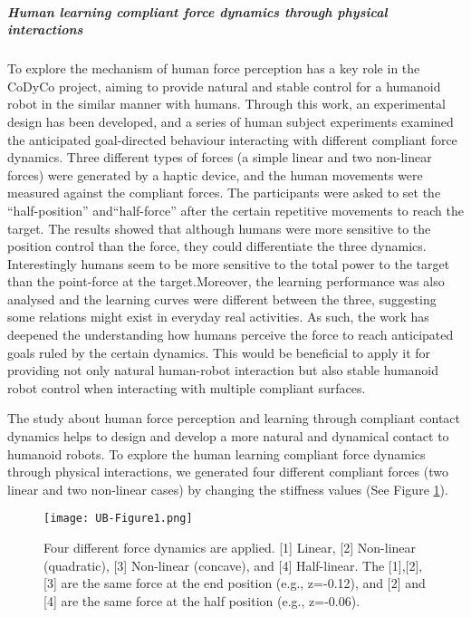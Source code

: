 \subparagraph*{Human learning compliant force dynamics through physical interactions}
To explore the mechanism of human force perception has a key role in the CoDyCo project, aiming to provide natural and stable control for a humanoid robot in the similar manner with humans. Through this work, an experimental design has been developed, and a series of human subject experiments examined the anticipated goal-directed behaviour interacting with different compliant force dynamics. Three different types of forces (a simple linear and two non-linear forces) were generated by a haptic device, and the human movements were measured against the compliant forces. The participants were asked to set the “half-position”  and“half-force”  after the certain repetitive movements to reach the target. The results showed that although humans were more sensitive to the position control than the force, they could differentiate the three dynamics. Interestingly humans seem to be more sensitive to the total power to the target than the point-force at the target.Moreover, the learning performance was also analysed and the learning curves were different between the three, suggesting some relations might exist in everyday real activities. As such, the work has deepened the understanding how humans perceive the force to reach anticipated goals ruled by the certain dynamics. This would be beneficial to apply it for providing not only natural human-robot interaction but also stable humanoid robot control when interacting with multiple compliant surfaces.

The study about human force perception and learning through compliant contact dynamics helps to design and develop a more natural and dynamical contact to humanoid robots. To explore the human learning compliant force dynamics through physical interactions, we generated four different compliant forces (two linear and two non-linear cases) by changing the stiffness values (See Figure \ref{fig:forcedyn}).

\begin{figure} 
	\centering
	\texttt{[image: UB-Figure1.png]}
	\caption{Four different force dynamics are applied. [1] Linear, [2] Non-linear (quadratic), [3] Non-linear (concave), and [4] Half-linear. The [1],[2],[3] are the same force at the end position (e.g., z=-0.12), and [2] and [4] are the same force at the half position  (e.g., z=-0.06).}
	\label{fig:forcedyn}
\end{figure}

\newpage

